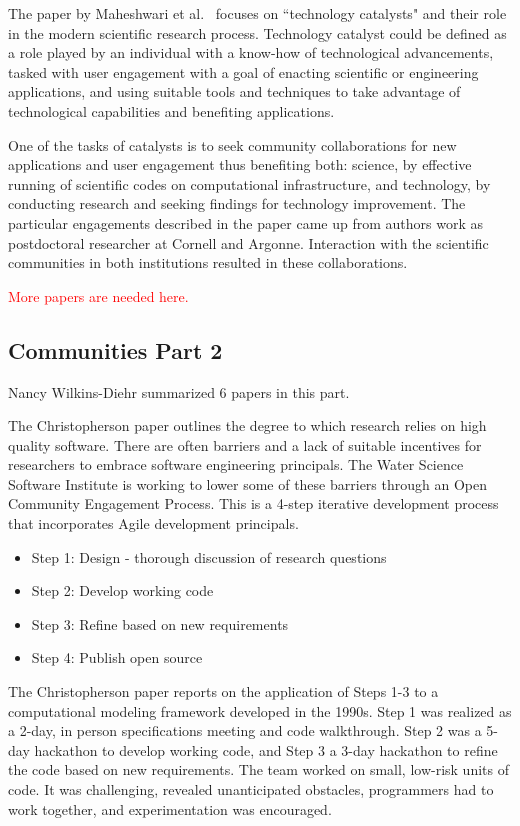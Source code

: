 \documentclass[11pt, oneside]{amsart}
\newcommand{\note}[1]{ {\textcolor{red}    { #1 }}}
\begin{document}
The paper by Maheshwari et al.~\cite{Maheshwari_WSSSPE} focuses on
``technology catalysts" and their role in the modern
scientific research process. Technology catalyst could be defined as a role
played by an individual with a know-how of technological advancements, tasked
with user engagement with a goal of enacting scientific or engineering
applications, and using suitable tools and techniques to take advantage of
technological capabilities and benefiting applications.

One of the tasks of catalysts is to seek community collaborations for new
applications and user engagement thus benefiting both: science, by effective
running of scientific codes on computational infrastructure, and technology,
by conducting research and seeking findings for technology improvement.
The particular engagements described in the paper came up from authors work as
postdoctoral researcher at Cornell and Argonne. Interaction with the scientific
communities in both institutions resulted in these collaborations.

\note{More papers are needed here.}

\subsection{Communities Part 2}

Nancy Wilkins-Diehr summarized 6 papers in this part.

The Christopherson paper outlines the degree to which research relies on high
quality software. There are often barriers and a lack of suitable incentives
for researchers to embrace software engineering principals. The Water Science
Software Institute is working to lower some of these barriers through an Open
Community Engagement Process. This is a 4-step iterative development process
that incorporates Agile development principals.

\begin{itemize}
\item Step 1: Design - thorough discussion of research questions
\item Step 2: Develop working code
\item Step 3: Refine based on new requirements
\item Step 4: Publish open source
\end{itemize}

The Christopherson paper reports on the application of Steps 1-3 to a
computational modeling framework developed in the 1990s. Step 1 was realized as
a 2-day, in person specifications meeting and code walkthrough. Step 2 was a
5-day hackathon to develop working code, and Step 3 a 3-day hackathon to refine
the code based on new requirements. The team worked on small, low-risk units of
code. It was challenging, revealed unanticipated obstacles, programmers had to
work together, and experimentation was encouraged.
\end{document}
